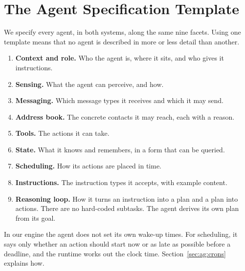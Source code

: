 \section{The Agent Specification Template}
\label{sec:ag:template}

We specify every agent, in both systems, along the same nine facets. Using one
template means that no agent is described in more or less detail than another.

\begin{enumerate}
  \item \textbf{Context and role.} Who the agent is, where it sits, and who
  gives it instructions.
  \item \textbf{Sensing.} What the agent can perceive, and how.
  \item \textbf{Messaging.} Which message types it receives and which it may
  send.
  \item \textbf{Address book.} The concrete contacts it may reach, each with a
  reason.
  \item \textbf{Tools.} The actions it can take.
  \item \textbf{State.} What it knows and remembers, in a form that can be
  queried.
  \item \textbf{Scheduling.} How its actions are placed in time.
  \item \textbf{Instructions.} The instruction types it accepts, with example
  content.
  \item \textbf{Reasoning loop.} How it turns an instruction into a plan and a
  plan into actions. There are no hard-coded subtasks. The agent derives its
  own plan from its goal.
\end{enumerate}

In our engine the agent does not set its own wake-up times. For scheduling, it
says only whether an action should start now or as late as possible before a
deadline, and the runtime works out the clock time. Section~\ref{sec:ag:crons}
explains how.

